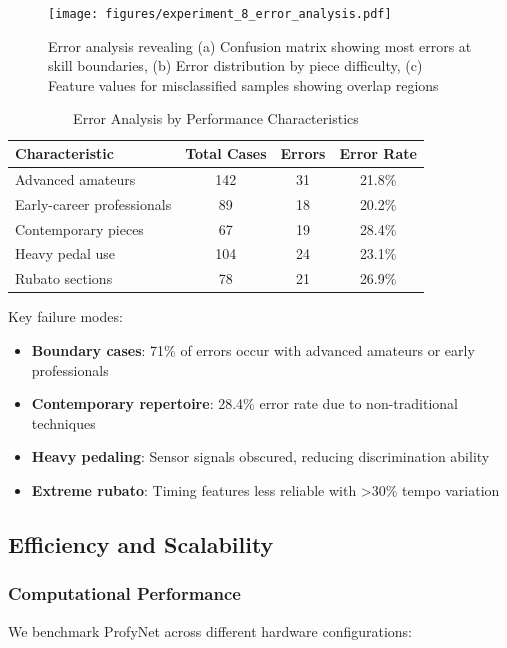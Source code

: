 \begin{figure}[h!]
  \centering
  \texttt{[image: figures/experiment\_8\_error\_analysis.pdf]}
  \caption{Error analysis revealing (a) Confusion matrix showing most errors at skill boundaries, (b) Error distribution by piece difficulty, (c) Feature values for misclassified samples showing overlap regions}
  \label{fig:error_analysis}
\end{figure}

\begin{table}[h!]
  \caption{Error Analysis by Performance Characteristics}
  \begin{tabular}{l|ccc}
    \toprule
    Characteristic & Total Cases & Errors & Error Rate\\
    \midrule
    Advanced amateurs & 142 & 31 & 21.8\%\\
    Early-career professionals & 89 & 18 & 20.2\%\\
    Contemporary pieces & 67 & 19 & 28.4\%\\
    Heavy pedal use & 104 & 24 & 23.1\%\\
    Rubato sections & 78 & 21 & 26.9\%\\
    \bottomrule
  \end{tabular}
  \label{tab:error_characteristics}
\end{table}

Key failure modes:
\begin{itemize}
\item \textbf{Boundary cases}: 71\% of errors occur with advanced amateurs or early professionals
\item \textbf{Contemporary repertoire}: 28.4\% error rate due to non-traditional techniques
\item \textbf{Heavy pedaling}: Sensor signals obscured, reducing discrimination ability
\item \textbf{Extreme rubato}: Timing features less reliable with >30\% tempo variation
\end{itemize}

\subsection{Efficiency and Scalability}

\subsubsection{Computational Performance}
We benchmark ProfyNet across different hardware configurations:

